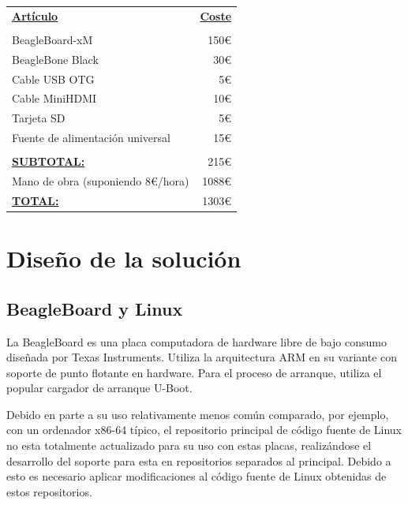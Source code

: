 \documentclass{tfg}
\begin{document}
\begin{minipage}{\textwidth}
\begin{center}
\begin{tabular}{lr}
{\ul \textbf{Artículo}}  & {\ul \textbf{Coste}} \\
\\
BeagleBoard-xM                   & 150\euro                 \\
BeagleBone Black                 & 30\euro                  \\
Cable USB OTG                    & 5\euro                 \\
Cable MiniHDMI                   & 10\euro                  \\
Tarjeta SD                       & 5\euro                  \\
Fuente de alimentación universal & 15\euro                  \\
\\
{\ul \textbf{SUBTOTAL:}}            & 215\euro
\\
	Mano de obra (suponiendo 8\euro/hora)                   & 1088\euro                 \\
{\ul \textbf{TOTAL:}}            & 1303\euro
\end{tabular}
\end{center}
\end{minipage}

\chapter{Diseño de la solución}
\section{BeagleBoard y Linux}
La BeagleBoard es una placa computadora de hardware libre de bajo consumo diseñada por Texas Instruments. \cite{beagleboardwiki} Utiliza la arquitectura ARM en su variante con soporte de punto flotante en hardware. Para el proceso de arranque, utiliza el popular cargador de arranque U-Boot.

Debido en parte a su uso relativamente menos común comparado, por ejemplo, con un ordenador x86-64 típico, el repositorio principal de código fuente de Linux no esta totalmente actualizado para su uso con estas placas, realizándose el desarrollo del soporte para esta en repositorios separados al principal. Debido a esto es necesario aplicar modificaciones al código fuente de Linux obtenidas de estos repositorios.
\end{document}
